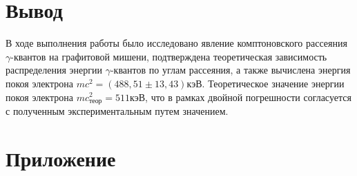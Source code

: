 \documentclass[12pt]{article}
\begin{document}
  \section{Вывод}

    В ходе выполнения работы было исследовано явление комптоновского рассеяния
    $\gamma$-квантов на графитовой мишени, подтверждена теоретическая
    зависимость распределения энергии $\gamma$-квантов по углам рассеяния, а
    также вычислена энергия покоя электрона $mc^2 = (488,51 \pm 13,43) кэВ$.
    Теоретическое значение энергии покоя электрона $mc^2_{теор} = 511 кэВ$, что
    в рамках двойной погрешности согласуется с полученным экспериментальным
    путем значением.

  \newpage
  \section*{Приложение}
  \label{add:spectres}
\end{document}
